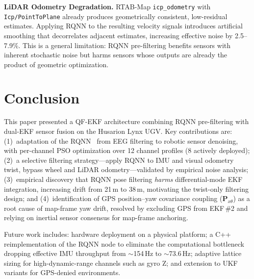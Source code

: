 \documentclass[conference]{IEEEtran}
\begin{document}
\noindent\textbf{LiDAR Odometry Degradation.}
RTAB-Map \texttt{icp\_odometry} with \texttt{Icp/PointToPlane} already produces
geometrically consistent, low-residual estimates. Applying RQNN to the resulting
velocity signals introduces artificial smoothing that decorrelates adjacent
estimates, increasing effective noise by 2.5--7.9\%. This is a general limitation:
RQNN pre-filtering benefits sensors with inherent stochastic noise but harms sensors
whose outputs are already the product of geometric optimization.

\section{Conclusion}

This paper presented a QF-EKF architecture combining RQNN pre-filtering with
dual-EKF sensor fusion on the Husarion Lynx UGV. Key contributions are:
(1)~adaptation of the RQNN~\cite{gandhi2014} from EEG filtering to robotic sensor
denoising, with per-channel PSO optimization over 12 channel profiles (8 actively
deployed); (2)~a selective filtering strategy---apply RQNN to IMU and visual
odometry twist, bypass wheel and LiDAR odometry---validated by empirical noise
analysis; (3)~empirical discovery that RQNN pose filtering \emph{harms}
differential-mode EKF integration, increasing drift from 21\,m to 38\,m, motivating
the twist-only filtering design; and (4)~identification of GPS position--yaw
covariance coupling ($\mathbf{P}_{x\theta}$) as a root cause of map-frame yaw drift,
resolved by excluding GPS from EKF\,\#2 and relying on inertial sensor consensus for
map-frame anchoring.

Future work includes: hardware deployment on a physical platform; a C++
reimplementation of the RQNN node to eliminate the computational bottleneck dropping
effective IMU throughput from $\sim$154\,Hz to $\sim$73.6\,Hz; adaptive lattice
sizing for high-dynamic-range channels such as gyro Z; and extension to UKF variants
for GPS-denied environments.
\end{document}
